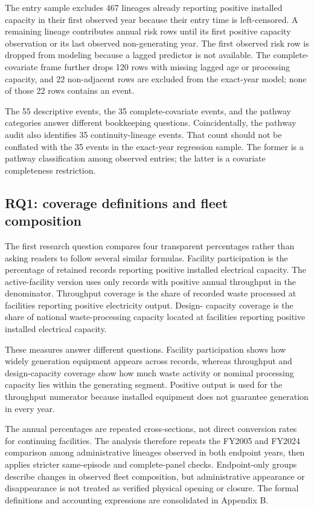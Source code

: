 \documentclass[12pt,letterpaper]{article}
\begin{document}
The entry sample excludes 467 lineages already reporting positive installed
capacity in their first observed year because their entry time is left-censored.
A remaining lineage contributes annual risk rows until its first positive
capacity observation or its last observed non-generating year. The first
observed risk row is dropped from modeling because a lagged predictor is not
available. The complete-covariate frame further drops 120 rows with missing
lagged age or processing capacity, and 22 non-adjacent rows are excluded from
the exact-year model; none of those 22 rows contains an event.

The 55 descriptive events, the 35 complete-covariate events, and the pathway
categories answer different bookkeeping questions. Coincidentally, the pathway
audit also identifies 35 continuity-lineage events. That count should not be
conflated with the 35 events in the exact-year regression sample. The former is
a pathway classification among observed entries; the latter is a covariate
completeness restriction.

\subsection{RQ1: coverage definitions and fleet composition}

The first research question compares four transparent percentages rather
than asking readers to follow several similar formulas. Facility participation
is the percentage of retained records reporting positive installed electrical
capacity. The active-facility version uses only records with positive annual
throughput in the denominator. Throughput coverage is the share of recorded
waste processed at facilities reporting positive electricity output. Design-
capacity coverage is the share of national waste-processing capacity located at
facilities reporting positive installed electrical capacity.

These measures answer different questions. Facility participation shows how
widely generation equipment appears across records, whereas throughput and
design-capacity coverage show how much waste activity or nominal processing
capacity lies within the generating segment. Positive output is used for the
throughput numerator because installed equipment does not guarantee generation
in every year.

The annual percentages are repeated cross-sections, not direct conversion rates
for continuing facilities. The analysis therefore repeats the FY2005 and FY2024
comparison among administrative lineages observed in both endpoint years, then
applies stricter same-episode and complete-panel checks. Endpoint-only groups
describe changes in observed fleet composition, but administrative appearance
or disappearance is not treated as verified physical opening or closure. The
formal definitions and accounting expressions are consolidated in Appendix B.
\end{document}

